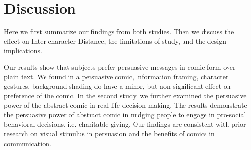 \section{Discussion}
\label{sec:Discussion}
Here we first summarize our findings from both studies. Then we discuss the effect on Inter-character Distance, the limitations of study, and the design implications.


Our results show that subjects prefer persuasive messages in comic form over plain text. We found in a persuasive comic, information framing, character gestures, background shading do have a minor, but non-significant effect on preference of the comic. In the second study, we further examined the persuasive power of the abstract comic in real-life decision making. The results demonstrate the persuasive power of abstract comic in nudging people to engage in pro-social behavioral decisions, i.e. charitable giving. Our findings are consistent with prior research on visual stimulus in persuasion and the benefits of comics in communication.

